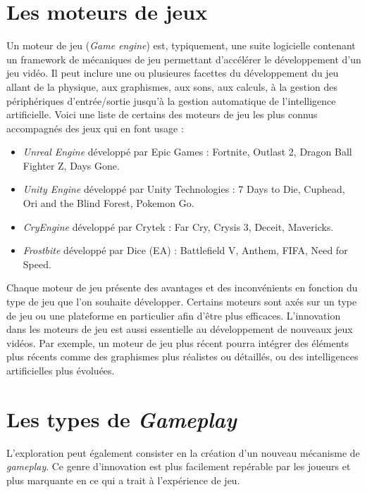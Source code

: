 \section{Les moteurs de jeux}
Un moteur de jeu (\emph{Game engine}) est, typiquement, une suite logicielle contenant un framework de mécaniques de jeu permettant d'accélérer le développement d'un jeu vidéo. Il peut inclure une ou plusieures facettes du développement du jeu allant de la physique, aux graphismes, aux sons, aux calculs, à la gestion des périphériques d'entrée/sortie jusqu'à la gestion automatique de l'intelligence artificielle. Voici une liste de certains des moteurs de jeu les plus connus accompagnés des jeux qui en font usage : 
\begin{itemize}
    \item \emph{Unreal Engine} \cite{UnrealEngine} développé par Epic Games : Fortnite, Outlast 2, Dragon Ball Fighter Z, Days Gone.
    \item \emph{Unity Engine} \cite{UnityEngine} développé par Unity Technologies : 7 Days to Die, Cuphead, Ori and the Blind Forest, Pokemon Go.
    \item \emph{CryEngine} \cite{CryEngine} développé par Crytek : Far Cry, Crysis 3, Deceit, Mavericks.
    \item \emph{Frostbite} \cite{FrostbiteEngine} développé par Dice (EA) : Battlefield V, Anthem, FIFA, Need for Speed.
\end{itemize}

Chaque moteur de jeu présente des avantages et des inconvénients en fonction du type de jeu que l'on souhaite développer. Certains moteurs sont axés sur un type de jeu ou une plateforme en particulier afin d'être plus efficaces. 
L'innovation dans les moteurs de jeu est aussi essentielle au développement de nouveaux jeux vidéos. 
Par exemple, un moteur de jeu plus récent pourra intégrer des éléments plus récents comme des graphismes plus réalistes ou détaillés, ou des intelligences artificielles plus évoluées.

\section{Les types de \emph{Gameplay}}
L'exploration peut également consister en la création d'un nouveau mécanisme de \emph{gameplay}. Ce genre d'innovation est plus facilement repérable par les joueurs et plus marquante en ce qui a trait \`a l'expérience de jeu. 

